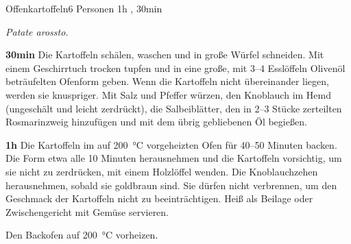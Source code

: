 \documentclass[../recipe-collections/cooking.tex]{subfiles}
\begin{document}
\begin{recipe}{Offenkartoffeln}{6 Personen }{1h , 30min }

  \freeform{}\textit{Patate arossto.}


  \textbf{30min}
  Die Kartoffeln schälen, waschen und in große Würfel schneiden.
  Mit einem Geschirrtuch trocken tupfen und in eine große, mit 3–4 Esslöffeln Olivenöl beträufelten Ofenform geben.
  Wenn die Kartoffeln nicht übereinander liegen, werden sie knuspriger.
  Mit Salz und Pfeffer würzen, den Knoblauch im Hemd (ungeschält und leicht zerdrückt), die Salbeiblätter, den in 2–3 Stücke zerteilten Rosmarinzweig hinzufügen und mit dem übrig gebliebenen Öl begießen.

  \newstep{}\textbf{1h}
  Die Kartoffeln im auf 200 °C vorgeheizten Ofen für 40–50 Minuten backen.
  Die Form etwa alle 10 Minuten herausnehmen und die Kartoffeln vorsichtig, um sie nicht zu zerdrücken, mit einem Holzlöffel wenden.
  Die Knoblauchzehen herausnehmen, sobald sie goldbraun sind.
  Sie dürfen nicht verbrennen, um den Geschmack der Kartoffeln nicht zu beeinträchtigen.
  Heiß als Beilage oder Zwischengericht mit Gemüse servieren.

  \freeform{}\hrulefill{}

  \freeform{}
  Den Backofen auf 200 °C vorheizen.

\end{recipe}
\end{document}
